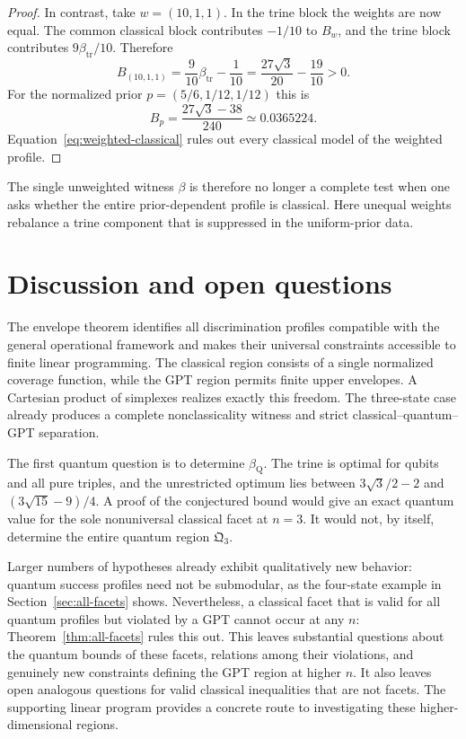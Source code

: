 \documentclass[a4paper,11pt,onecolumn,unpublished]{quantumarticle}
\theoremstyle{definition}
\newcommand{\1}{\mathbf 1}
\newcommand{\Qreg}{\mathfrak Q}
\newcommand{\btr}{\beta_{\mathrm{tr}}}
\begin{document}
\begin{proof}
In contrast, take $w=(10,1,1)$. In the trine block the weights are now equal.
The common classical block contributes $-1/10$ to $B_w$, and the trine block
contributes $9\btr/10$. Therefore
\begin{equation}\label{eq:hidden-weighted-beta}
 B_{(10,1,1)}=\frac9{10}\btr-\frac1{10}
 =\frac{27\sqrt3}{20}-\frac{19}{10}>0.
\end{equation}
For the normalized prior $p=(5/6,1/12,1/12)$ this is
\[
 B_p=\frac{27\sqrt3-38}{240}\simeq0.0365224.
\]
Equation~\eqref{eq:weighted-classical} rules out every classical model of the
weighted profile.
\end{proof}

The single unweighted witness $\beta$ is therefore no longer a complete test
when one asks whether the entire prior-dependent profile is classical. Here
unequal weights rebalance a trine component that is suppressed in the
uniform-prior data.

\section{Discussion and open questions}\label{sec:discussion}

The envelope theorem identifies all discrimination profiles compatible with
the general operational framework and makes their universal constraints
accessible to finite linear programming. The classical region consists of a
single normalized coverage function, while the GPT region permits finite upper
envelopes. A Cartesian product of simplexes realizes exactly this freedom.
The three-state case already produces a complete nonclassicality witness and
strict classical--quantum--GPT separation.

The first quantum question is to determine $\beta_{\mathrm Q}$. The trine is
optimal for qubits and all pure triples, and the unrestricted optimum lies
between $3\sqrt3/2-2$ and $(3\sqrt{15}-9)/4$. A proof of the conjectured
bound would give
an exact quantum value for the sole nonuniversal classical facet at $n=3$.
It would not, by itself, determine the entire quantum region $\Qreg_3$.

Larger numbers of hypotheses already exhibit qualitatively new behavior:
quantum success profiles need not be submodular, as the four-state example in
Section~\ref{sec:all-facets} shows. Nevertheless, a classical facet that is
valid for all quantum profiles but violated by a GPT cannot occur at any $n$:
Theorem~\ref{thm:all-facets} rules this out. This leaves substantial questions
about the quantum bounds of these facets, relations among their violations,
and genuinely new constraints defining the GPT region at higher $n$.
It also leaves open analogous questions for valid classical inequalities
that are not facets. The supporting linear program provides a concrete route
to investigating these higher-dimensional regions.
\end{document}
